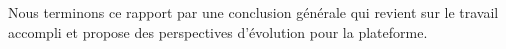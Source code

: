 \documentclass[a4paper,12pt]{report}
\begin{document}
Nous terminons ce rapport par une conclusion générale qui revient sur le travail accompli et propose des perspectives d'évolution pour la plateforme.















  {}
  {}
\end{document}
